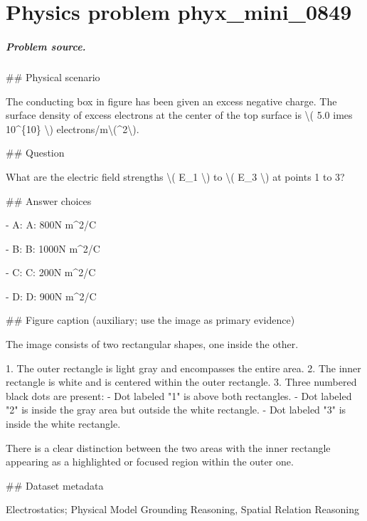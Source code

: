 
\chapter{Physics problem phyx\_mini\_0849}
\label{ch:PhyXMiniProblems_problem_phyx_mini_0849}

\paragraph{Problem source.}
\#\# Physical scenario

The conducting box in figure has been given an excess negative charge. The surface density of excess electrons at the center of the top surface is \textbackslash{}( 5.0 	imes 10\textasciicircum{}\{10\} \textbackslash{}) electrons/m\textbackslash{}(\textasciicircum{}2\textbackslash{}).

\#\# Question

What are the electric field strengths \textbackslash{}( E\_1 \textbackslash{}) to \textbackslash{}( E\_3 \textbackslash{}) at points 1 to 3?

\#\# Answer choices

- A: A: 800N m\textasciicircum{}2/C

- B: B: 1000N m\textasciicircum{}2/C

- C: C: 200N m\textasciicircum{}2/C

- D: D: 900N m\textasciicircum{}2/C

\#\# Figure caption (auxiliary; use the image as primary evidence)

The image consists of two rectangular shapes, one inside the other. 

1. The outer rectangle is light gray and encompasses the entire area.
2. The inner rectangle is white and is centered within the outer rectangle.
3. Three numbered black dots are present:
   - Dot labeled "1" is above both rectangles.
   - Dot labeled "2" is inside the gray area but outside the white rectangle.
   - Dot labeled "3" is inside the white rectangle.

There is a clear distinction between the two areas with the inner rectangle appearing as a highlighted or focused region within the outer one.

\#\# Dataset metadata

Electrostatics; Physical Model Grounding Reasoning, Spatial Relation Reasoning

